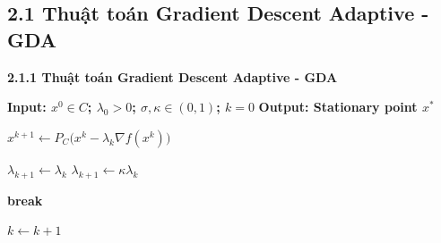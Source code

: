 \subsection{2.1 Thuật toán Gradient Descent Adaptive - GDA}
\begin{frame}[shrink]{\textbf{\large 2.1.1 Thuật toán Gradient Descent Adaptive - GDA}}
\vspace*{-1cm}
\footnotesize
\begin{algorithm}[H]
\caption{(Gradient Descent Adaptive Algorithm-GDA)}
\begin{algorithmic}[1]

\State \textbf{Input: $x^0 \in C$; $\lambda_0 > 0$; $\sigma, \kappa \in (0,1)$; $k=0$ }
\State \textbf{Output: Stationary point $x^*$}

    \State $x^{k+1} \gets P_C\big(x^k - \lambda_k \nabla f(x^k)\big)$

        \State $\lambda_{k+1} \gets \lambda_k$
    \Else
        \State $\lambda_{k+1} \gets \kappa \lambda_k$
    \EndIf

        \State \textbf{break}
    \EndIf

    \State $k \gets k + 1$
\EndWhile

\end{algorithmic}
\end{algorithm}
    
\end{frame}

